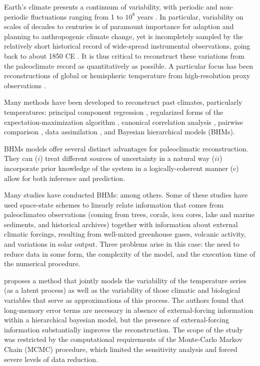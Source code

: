 \documentclass[12pt]{amsart}
\theoremstyle{plain}
\theoremstyle{definition}
\theoremstyle{remark}
\begin{document}
Earth's climate presents a continuum of variability, with periodic and non-periodic fluctuations ranging from 1 to $10^8$ years \citep{pelletier_power_1998,ghil2002natural,huybers_links_2006}. In particular, variability on scales of decades to centuries is of paramount importance for adaption and planning to anthropogenic climate change, yet is incompletely sampled by the relatively short historical record of wide-spread instrumental observations, going back to about 1850 CE \citep{AR5_chap5}. It is thus critical to reconstruct these variations from the paleoclimate record as quantitatively as possible.  A particular focus has been reconstructions of global or hemispheric temperature from high-resolution proxy observations \citep{Jones_Holocene09}.

Many methods have been developed to reconstruct past climates, particularly temperatures:  principal component regression
\citep{MBH98,MBH99,luterbacher2004european,Wahl2012,Neukom:2014}, regularized forms of the expectation-maximization algorithm \citep{Schneider2001,bradley2005proxy,mann2005testing,mann2007robust,rutherford2003climate,steig2009,JEG10a,JEG10b,Guillot_AOAS2015}, canonical
correlation analysis \citep{smerdon2010pseudoproxy,Wang_CP2014,Evans_grl2014}, pairwise comparison
\citep{Hanhijarvi2013,Gergis2016}, data assimilation \cite{Lee_CD08,Hakim2016}, and Bayesian hierarchical models (BHMs). 

BHMs models offer several distinct advantages for paleoclimatic reconstruction. They can ($i$) treat different sources of uncertainty in a natural way ($ii$) incorporate prior knowledge of the system in a logically-coherent manner \citep{Jaynes04} (c) allow for both inference and prediction. 

Many studies have conducted BHMs: \citep{boli1, tingley1,tingley2,tingley2013_Ext,werner2012pseudoproxy,Barboza2014} among others. Some of these studies have used space-state
schemes to linearly relate information that comes from paleoclimateo observations (coming from trees, corals, icea cores, lake and marine sediments, and historical archives) together with information about external climatic forcings, resulting from 
well-mixed greenhouse gases, volcanic activity, and variations in solar output.   Three problems arise in this
case: the need to reduce data in some form, the complexity of the model, and the execution time of the numerical procedure. 

\cite{Barboza2014} proposes a method that jointly models the variability of the
temperature series (as a latent process) as well as the variability of those
climatic and biological variables that serve as approximations of this process.
The authors found that long-memory error terms are necessary in absence of
external-forcing information within a hierarchical bayesian model, but the
presence of external-forcing information substantially improves the reconstruction. The scope of the study was restricted by the computational requirements of the Monte-Carlo Markov Chain (MCMC) procedure, which limited the sensitivity analysis and forced severe levels of data reduction. 
\end{document}
